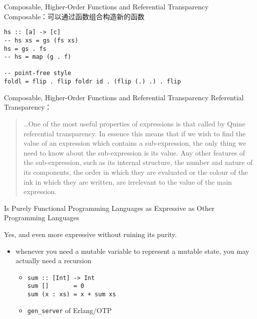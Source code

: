 \documentclass{beamer}
\begin{document}
\begin{frame}[fragile]{Composable, Higher-Order Functions and Referential Transparency}
Composable：可以通过函数组合构造新的函数
\begin{verbatim}
hs :: [a] -> [c]
-- hs xs = gs (fs xs)
hs = gs . fs
-- hs = map (g . f)

-- point-free style
foldl = flip . flip foldr id . (flip (.) .) . flip
\end{verbatim}
\end{frame}

\begin{frame}[fragile]{Composable, Higher-Order Functions and Referential Transparency}
Referential Transparency：
\begin{quote}
    \ldots One of the most useful properties of expressions is that called by Quine referential transparency. In essence this means that if we wish to find the value of an expression which contains a sub-expression, the only thing we need to know about the sub-expression is its value. Any other features of the sub-expression, such as its internal structure, the number and nature of its components, the order in which they are evaluated or the colour of the ink in which they are written, are irrelevant to the value of the main expression.
\end{quote}
\end{frame}

\begin{frame}[fragile]{Is Purely Functional Programming Languages as Expressive as Other Programming Languages}

Yes, and even more expressive without ruining its purity.

\begin{itemize}
\item whenever you need a mutable variable to represent a mutable state, you may actually need a recursion
\begin{itemize}
    \pause\item \begin{verbatim}
sum :: [Int] -> Int
sum []       = 0
sum (x : xs) = x + sum xs
    \end{verbatim}
    \pause\item {\tt gen\_server} of Erlang/OTP
\end{itemize}
\end{itemize}

\end{frame}
\end{document}
